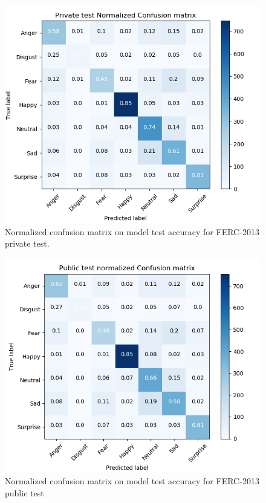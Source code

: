 \documentclass[master]{thesis-uestc}
\begin{document}
\begin{figure}[ht]
\includegraphics[width=5in]{pic/FER-2013_private_test_CM_normalzed.png}
\caption{Normalized confusion matrix on model test accuracy for FERC-2013 private test.}
\label{fig_ferpr_cm_scores}
\end{figure}

\begin{figure}[ht]
\includegraphics[width=5in]{pic/FER-2013_public_test_CM_normalzed.png}
\caption{Normalized confusion matrix on model test accuracy for FERC-2013 public test}
\label{fig_ferpub_cm_scores}
\end{figure}
\end{document}
